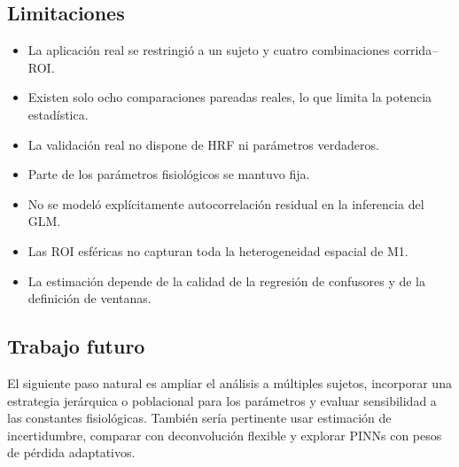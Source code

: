\subsection{Limitaciones}

\begin{itemize}
    \item La aplicación real se restringió a un sujeto y cuatro combinaciones corrida--ROI.
    \item Existen solo ocho comparaciones pareadas reales, lo que limita la potencia estadística.
    \item La validación real no dispone de HRF ni parámetros verdaderos.
    \item Parte de los parámetros fisiológicos se mantuvo fija.
    \item No se modeló explícitamente autocorrelación residual en la inferencia del GLM.
    \item Las ROI esféricas no capturan toda la heterogeneidad espacial de M1.
    \item La estimación depende de la calidad de la regresión de confusores y de la definición de ventanas.
\end{itemize}

\subsection{Trabajo futuro}

El siguiente paso natural es ampliar el análisis a múltiples sujetos, incorporar una estrategia jerárquica o poblacional para los parámetros y evaluar sensibilidad a las constantes fisiológicas. También sería pertinente usar estimación de incertidumbre, comparar con deconvolución flexible y explorar PINNs con pesos de pérdida adaptativos.
